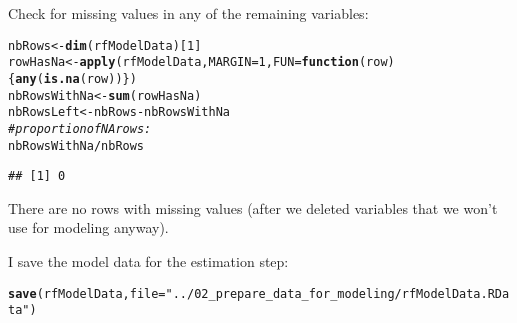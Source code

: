 \documentclass{article}\usepackage[]{graphicx}\usepackage[]{color}
\makeatletter
\newcommand{\hlnum}[1]{\textcolor[rgb]{0.686,0.059,0.569}{#1}}%
\newcommand{\hlstr}[1]{\textcolor[rgb]{0.192,0.494,0.8}{#1}}%
\newcommand{\hlcom}[1]{\textcolor[rgb]{0.678,0.584,0.686}{\textit{#1}}}%
\newcommand{\hlopt}[1]{\textcolor[rgb]{0,0,0}{#1}}%
\newcommand{\hlstd}[1]{\textcolor[rgb]{0.345,0.345,0.345}{#1}}%
\newcommand{\hlkwa}[1]{\textcolor[rgb]{0.161,0.373,0.58}{\textbf{#1}}}%
\newcommand{\hlkwb}[1]{\textcolor[rgb]{0.69,0.353,0.396}{#1}}%
\newcommand{\hlkwc}[1]{\textcolor[rgb]{0.333,0.667,0.333}{#1}}%
\newcommand{\hlkwd}[1]{\textcolor[rgb]{0.737,0.353,0.396}{\textbf{#1}}}%
\newenvironment{kframe}{%
 \def\at@end@of@kframe{}%
 \ifinner\ifhmode%
  \def\at@end@of@kframe{\end{minipage}}%
  \begin{minipage}{\columnwidth}%
 \fi\fi%
 \def\FrameCommand##1{\hskip\@totalleftmargin \hskip-\fboxsep
 \colorbox{shadecolor}{##1}\hskip-\fboxsep
     \hskip-\linewidth \hskip-\@totalleftmargin \hskip\columnwidth}%
 \MakeFramed {\advance\hsize-\width
   \@totalleftmargin\z@ \linewidth\hsize
   \@setminipage}}%
 {\par\unskip\endMakeFramed%
 \at@end@of@kframe}
\newenvironment{knitrout}{}{} %
\makeatother
\begin{document}
Check for missing values in any of the remaining variables:
\begin{knitrout}
\color{fgcolor}\begin{kframe}
\begin{alltt}
\hlstd{nbRows} \hlkwb{<-} \hlkwd{dim}\hlstd{(rfModelData)[}\hlnum{1}\hlstd{]}
\hlstd{rowHasNa} \hlkwb{<-} \hlkwd{apply}\hlstd{(rfModelData,} \hlkwc{MARGIN}\hlstd{=}\hlnum{1}\hlstd{,} \hlkwc{FUN}\hlstd{=}\hlkwa{function}\hlstd{(}\hlkwc{row}\hlstd{)\{} \hlkwd{any}\hlstd{(}\hlkwd{is.na}\hlstd{(row)) \})}
\hlstd{nbRowsWithNa} \hlkwb{<-} \hlkwd{sum}\hlstd{(rowHasNa)}
\hlstd{nbRowsLeft} \hlkwb{<-} \hlstd{nbRows} \hlopt{-} \hlstd{nbRowsWithNa}
\hlcom{# proportion of NA rows:}
\hlstd{nbRowsWithNa} \hlopt{/} \hlstd{nbRows}
\end{alltt}
\begin{verbatim}
## [1] 0
\end{verbatim}
\end{kframe}
\end{knitrout}

There are no rows with missing values (after we deleted variables that we won't use for modeling anyway).

I save the model data for the estimation step:
\begin{knitrout}
\color{fgcolor}\begin{kframe}
\begin{alltt}
\hlkwd{save}\hlstd{(rfModelData,} \hlkwc{file}\hlstd{=}\hlstr{"../02_prepare_data_for_modeling/rfModelData.RData"}\hlstd{)}
\end{alltt}
\end{kframe}
\end{knitrout}
\end{document}
